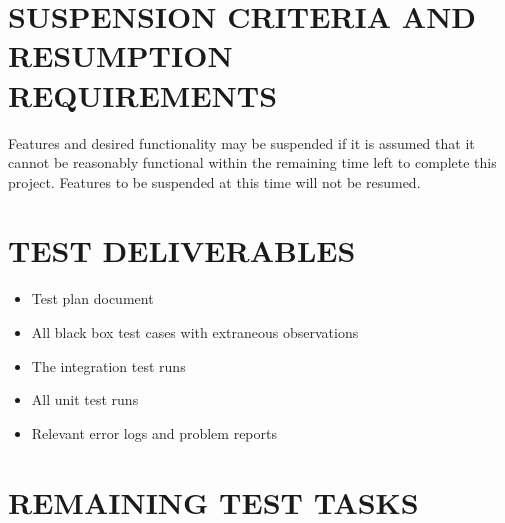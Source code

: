 \documentclass[twoside,letterpaper]{article}
\begin{document}
\section[SUSPENSION CRITERIA]
{\bfseries SUSPENSION CRITERIA AND RESUMPTION 
\\REQUIREMENTS}

Features and desired functionality may be suspended if it is assumed that it cannot be reasonably functional within the remaining time left to complete this project. 
Features to be suspended at this time will not be resumed.

\section[TEST DELIVERABLES]
{\bfseries TEST DELIVERABLES}

\begin{itemize}
\item Test plan document
\item All black box test cases with extraneous observations
\item The integration test runs 
\item All unit test runs 
\item Relevant error logs and problem reports
\end{itemize}


\section[REMAINING TEST TASKS]{\bfseries REMAINING TEST TASKS}

\end{document}
